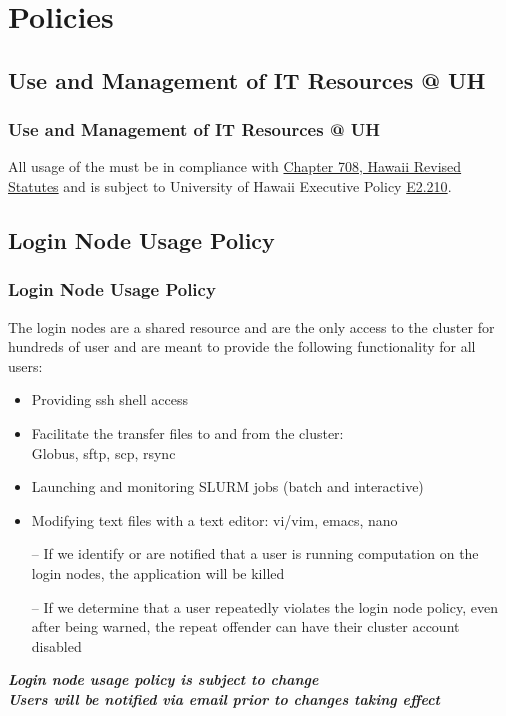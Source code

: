 \section{Policies}

\subsection{Use and Management of IT Resources @ UH }
\begin{frame}
  \frametitle{Use and Management of IT Resources @ UH }
  All usage of the {\craycs} must be in compliance with \href{http://www.hawaii.edu/infotech/policies/itpolicy.html\#appendixa}{Chapter 708, Hawaii Revised Statutes} and is subject to University of Hawaii Executive Policy \href{http://www.hawaii.edu/infotech/policies/itpolicy.html}{E2.210}. 
\end{frame}

\subsection{Login Node Usage Policy}
\begin{frame}
\frametitle{Login Node Usage Policy}\footnotesize
The login nodes are a shared resource and are the only access to the cluster for hundreds of user and are meant to provide the following functionality for all users: 
\begin{itemize}
\item Providing ssh shell access 
\item Facilitate the transfer files to and from the cluster:\\Globus, sftp, scp, rsync
\item Launching and monitoring SLURM jobs (batch and interactive)
\item Modifying text files with a text editor: vi/vim, emacs, nano
\end{itemize}
\bigskip
\begin{itemize}
\item[--] If we identify or are notified that a user is running computation on the login nodes, the application will be killed
\item[--] If we determine that a user repeatedly violates the login node policy, even after being warned, the repeat offender can have their cluster account disabled
\end{itemize}
\btVFill
\begin{center}
\footnotesize \textbf{\emph{Login node usage policy is subject to change~\\Users will be notified via email prior to changes taking effect}}
\end{center}
\end{frame}


